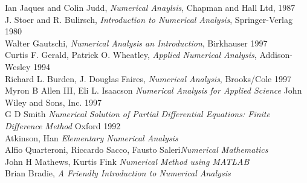 \begin{thebibliography}{99}
 Ian Jaques and Colin Judd,
{\it Numerical Anaylsis}, Chapman and Hall Ltd, 1987
\\
 J. Stoer and R. Bulirsch,
{\it Introduction to Numerical Analysis}, Springer-Verlag 1980\\
 Walter Gautschi,
{\it Numerical Analysis an Introduction}, Birkhauser 1997\\
 Curtis F. Gerald, Patrick O. Wheatley,
{\it Applied Numerical Analysis}, Addison-Wesley 1994\\
 Richard L. Burden, J. Douglas Faires,
{\it Numerical Analysis}, Brooks/Cole 1997\\
 Myron B Allen III, Eli L. Isaacson
{\it Numerical Analysis for Applied Science} John Wiley and Sons, Inc. 1997\\
 G D Smith
{\it Numerical Solution of Partial Differential Equations: Finite Difference Method}
Oxford 1992\\
 Atkinson, Han
{\it Elementary Numerical Analysis }\\
 Alfio Quarteroni, Riccardo Sacco, Fausto Saleri{\it Numerical Mathematics}\\
 John H Mathews,  Kurtis Fink
{\it Numerical Method using MATLAB}\\
 Brian Bradie,  
{\it A Friendly Introduction to Numerical Analysis}\\

\end{thebibliography}